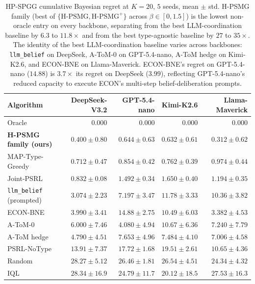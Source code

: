 \documentclass{article}
\begin{document}
\begin{table}[t]
\centering
\caption{HP-SPGG cumulative Bayesian regret at $K = 20$, $5$ seeds,
mean $\pm$ std. H-PSMG family (best of $\{\text{H-PSMG}, \text{H-PSMG}^+\}$
across $\beta \in [0, 1.5]$) is the lowest non-oracle entry on every backbone,
separating from the best LLM-coordination baseline by $6.3$ to $11.8\times$
and from the best type-agnostic baseline by $27$ to $35\times$. The identity
of the best LLM-coordination baseline varies across backbones: \texttt{llm\_belief}
on DeepSeek, A-ToM-0 on GPT-5.4-nano, A-ToM hedge on Kimi-K2.6, and ECON-BNE
on Llama-Maverick. ECON-BNE's regret on GPT-5.4-nano ($14.88$) is $3.7\times$
its regret on DeepSeek ($3.99$), reflecting GPT-5.4-nano's reduced capacity to
execute ECON's multi-step belief-deliberation prompts.}
\label{tab:hp-spgg-headline}
\small
\begin{tabular}{lrrrr}
\toprule
Algorithm & DeepSeek-V3.2 & GPT-5.4-nano & Kimi-K2.6 & Llama-Maverick \\
\midrule
Oracle                         & $0.000$               & $0.000$               & $0.000$               & $0.000$ \\
\textbf{H-PSMG family (ours)}  & $\mathbf{0.400 \pm 0.80}$ & $\mathbf{0.644 \pm 0.63}$ & $\mathbf{0.632 \pm 0.61}$ & $\mathbf{0.312 \pm 0.62}$ \\
MAP-Type-Greedy                & $0.712 \pm 0.47$      & $0.854 \pm 0.42$      & $0.762 \pm 0.39$      & $0.974 \pm 0.44$ \\
Joint-PSRL                     & $0.832 \pm 0.08$      & $1.492 \pm 0.34$      & $1.650 \pm 0.40$      & $1.194 \pm 0.35$ \\
\midrule
\texttt{llm\_belief} (prompted)         & $3.074 \pm 2.23$  & $7.197 \pm 3.47$  & $11.78 \pm 3.33$  & $10.36 \pm 3.82$ \\
ECON-BNE \citep{yang2025econ}           & $3.990 \pm 3.41$  & $14.88 \pm 2.75$  & $10.49 \pm 6.03$  & $3.382 \pm 4.53$ \\
A-ToM-0 \citep{xu2026atom}              & $6.000 \pm 7.46$  & $4.080 \pm 4.94$  & $10.67 \pm 6.36$  & $7.240 \pm 7.79$ \\
A-ToM hedge \citep{xu2026atom}          & $4.790 \pm 4.51$  & $7.653 \pm 4.96$  & $7.484 \pm 4.10$  & $7.006 \pm 4.58$ \\
\midrule
PSRL-NoType                    & $13.91 \pm 7.37$ & $17.72 \pm 1.68$ & $19.51 \pm 2.61$ & $10.65 \pm 4.36$ \\
Random                         & $28.27 \pm 5.12$ & $26.46 \pm 1.81$ & $26.54 \pm 4.51$ & $24.34 \pm 4.32$ \\
IQL                            & $28.34 \pm 16.9$ & $24.79 \pm 11.7$ & $20.12 \pm 18.5$ & $27.53 \pm 16.3$ \\
\bottomrule
\end{tabular}
\end{table}
\end{document}
